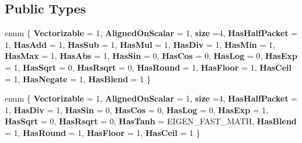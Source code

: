 \subsection*{Public Types}
\begin{DoxyCompactItemize}
\item 
\mbox{\label{struct_eigen_1_1internal_1_1packet__traits_3_01float_01_4_ac7f3fcab8b0acbdbd49bb89582f60c36}} 
enum \{ \newline
{\bfseries Vectorizable} = 1, 
{\bfseries Aligned\+On\+Scalar} = 1, 
{\bfseries size} =4, 
{\bfseries Has\+Half\+Packet} = 1, 
\newline
{\bfseries Has\+Add} = 1, 
{\bfseries Has\+Sub} = 1, 
{\bfseries Has\+Mul} = 1, 
{\bfseries Has\+Div} = 1, 
\newline
{\bfseries Has\+Min} = 1, 
{\bfseries Has\+Max} = 1, 
{\bfseries Has\+Abs} = 1, 
{\bfseries Has\+Sin} = 0, 
\newline
{\bfseries Has\+Cos} = 0, 
{\bfseries Has\+Log} = 0, 
{\bfseries Has\+Exp} = 1, 
{\bfseries Has\+Sqrt} = 0, 
\newline
{\bfseries Has\+Rsqrt} = 0, 
{\bfseries Has\+Round} = 1, 
{\bfseries Has\+Floor} = 1, 
{\bfseries Has\+Ceil} = 1, 
\newline
{\bfseries Has\+Negate} = 1, 
{\bfseries Has\+Blend} = 1
 \}
\item 
\mbox{\label{struct_eigen_1_1internal_1_1packet__traits_3_01float_01_4_a9a156ca733c4797b3bb92d3a0f4cfa5f}} 
enum \{ \newline
{\bfseries Vectorizable} = 1, 
{\bfseries Aligned\+On\+Scalar} = 1, 
{\bfseries size} =4, 
{\bfseries Has\+Half\+Packet} = 1, 
\newline
{\bfseries Has\+Div} = 1, 
{\bfseries Has\+Sin} = 0, 
{\bfseries Has\+Cos} = 0, 
{\bfseries Has\+Log} = 0, 
\newline
{\bfseries Has\+Exp} = 1, 
{\bfseries Has\+Sqrt} = 0, 
{\bfseries Has\+Rsqrt} = 0, 
{\bfseries Has\+Tanh} = E\+I\+G\+E\+N\+\_\+\+F\+A\+S\+T\+\_\+\+M\+A\+TH, 
\newline
{\bfseries Has\+Blend} = 1, 
{\bfseries Has\+Round} = 1, 
{\bfseries Has\+Floor} = 1, 
{\bfseries Has\+Ceil} = 1
 \}
\item 
\mbox{\label{struct_eigen_1_1internal_1_1packet__traits_3_01float_01_4_a64faace9eb6fd4d6ceca181c2a45030c}} 

\end{DoxyCompactItemize}
